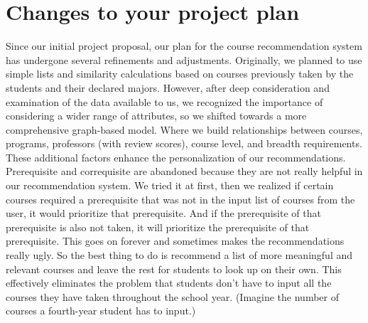 \documentclass[fontsize=11pt]{article}
\begin{document}
\section*{Changes to your project plan}
Since our initial project proposal, our plan for the course recommendation system has undergone several refinements and adjustments. Originally, we planned to use simple lists and similarity calculations based on courses previously taken by the students and their declared majors. However, after deep consideration and examination of the data available to us, we recognized the importance of considering a wider range of attributes, so we shifted towards a more comprehensive graph-based model. Where we build relationships between courses, programs, professors (with review scores), course level, and breadth requirements. These additional factors enhance the personalization of our recommendations. Prerequisite and correquisite are abandoned because they are not really helpful in our recommendation system. We tried it at first, then we realized if certain courses required a prerequisite that was not in the input list of courses from the user, it would prioritize that prerequisite. And if the prerequisite of that prerequisite is also not taken, it will prioritize the prerequisite of that prerequisite. This goes on forever and sometimes makes the recommendations really ugly. So the best thing to do is recommend a list of more meaningful and relevant courses and leave the rest for students to look up on their own. This effectively eliminates the problem that students don't have to input all the courses they have taken throughout the school year. (Imagine the number of courses a fourth-year student has to input.)
\end{document}
